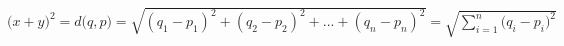 \documentclass[preview]{standalone}
\begin{document}
\begin{center}
$(x + y\big)^2=d\big(q, p\big)=\sqrt{(q_1-p_1)^2+(q_2-p_2)^2+...+(q_n-p_n)^2}=\sqrt{\sum_{i=1}^n\big(q_i-p_i\big)^2}$
\end{center}
\end{document}
